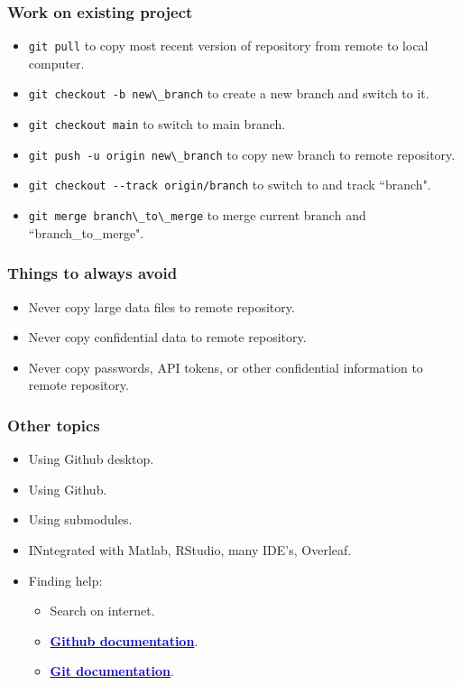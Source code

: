 \documentclass{beamer}
\begin{document}
\begin{frame}
\frametitle{Work on existing project}
\begin{itemize}
\item \lstinline{git pull} to copy most recent version of repository from remote to local computer.
\item \lstinline{git checkout -b new\_branch} to create a new branch and switch to it.
\item \lstinline{git checkout main} to switch to main branch.
\item \lstinline{git push -u origin new\_branch} to copy new branch to remote repository.
\item \lstinline{git checkout --track origin/branch} to switch to and track ``branch".
\item \lstinline{git merge branch\_to\_merge} to merge current branch and ``branch\_to\_merge".
\end{itemize}
\end{frame}

\begin{frame}
\frametitle{Things to always avoid}
\begin{itemize}
\item Never copy large data files to remote repository.
\item Never copy confidential data to remote repository.
\item Never copy passwords, API tokens, or other confidential information to remote repository.
\end{itemize}
\end{frame}

\begin{frame}
\frametitle{Other topics}
\begin{itemize}
\item Using Github desktop.
\item Using Github.
\item Using submodules.
\item INntegrated with Matlab, RStudio, many IDE's, Overleaf.
\item Finding help:
\begin{itemize}
\item Search on internet.
\item  \href{https://docs.github.com/en/get-started/using-git/about-git}{\textcolor{blue}{\textbf{Github documentation}}}.
\item \href{https://git-scm.com/doc}{\textcolor{blue}{\textbf{Git documentation}}}.
\end{itemize}
\end{itemize}
\end{frame}
\end{document}
